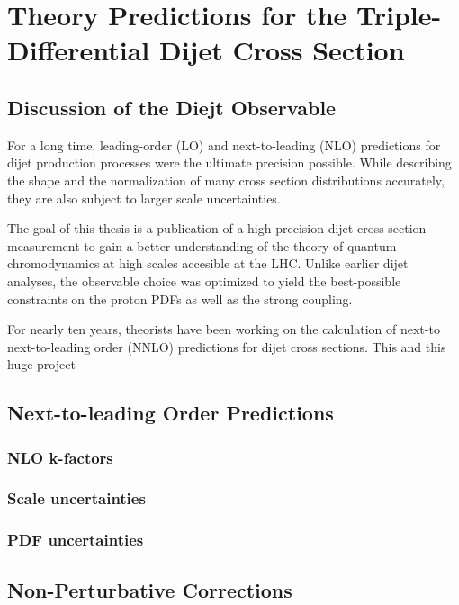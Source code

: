 
\chapter{Theory Predictions for the Triple-Differential Dijet Cross Section}

\section{Discussion of the Diejt Observable}

For a long time, leading-order (LO) and next-to-leading (NLO) predictions
for dijet production processes were the ultimate precision possible. While
describing the shape and the normalization of many cross section distributions
accurately, they are also subject to larger scale uncertainties. 

The goal of this thesis is a publication of a high-precision dijet cross section
measurement to gain a better understanding of the theory of quantum chromodynamics
at high scales accesible at the LHC. Unlike earlier dijet analyses, the observable
choice was optimized to yield the best-possible constraints on the proton PDFs as well
as the strong coupling.

For nearly ten years, theorists have been working on the calculation of next-to
next-to-leading order (NNLO) predictions for dijet cross sections. This  and this
huge project



\section{Next-to-leading Order Predictions}

\subsection{NLO k-factors}

\subsection{Scale uncertainties}

\subsection{PDF uncertainties}

\section{Non-Perturbative Corrections}
